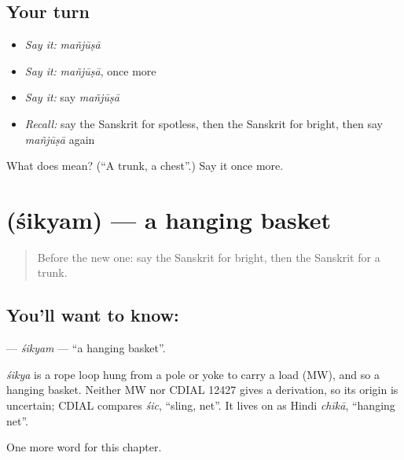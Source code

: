 \subsection*{Your turn}
\begin{itemize}
\raggedright
  \item \emph{Say it:} \emph{mañjūṣā}
  \item \emph{Say it:} \emph{mañjūṣā}, once more
  \item \emph{Say it:} say \emph{mañjūṣā}
  \item \emph{Recall:} say the Sanskrit for spotless, then the Sanskrit for bright, then say \emph{mañjūṣā} again
\end{itemize}

\begin{tcolorbox}[breakable,colback=teal!4,colframe=teal!35!black,title={Before you move on}]
What does  mean? (\textquotedblleft{}A trunk, a chest\textquotedblright{}.) Say it once more.
\end{tcolorbox}
\section[\texorpdfstring{\sk{शिक्यम्} (śikyam)}{शिक्यम् (śikyam)}]{ (śikyam) — a hanging basket}

\label{lesson:SA-C189-sikyam}



\begin{quote}
Before the new one: say the Sanskrit for bright, then the Sanskrit for a trunk.
\end{quote}

\subsection*{You'll want to know: }
\textbf{} — \emph{śikyam} — \textquotedblleft{}a hanging basket\textquotedblright{}.

\begin{cousinweb}
\emph{śikya} is a rope loop hung from a pole or yoke to carry a load (MW), and so a hanging basket. Neither MW nor CDIAL 12427 gives a derivation, so its origin is uncertain; CDIAL compares \emph{śic}, \textquotedblleft{}sling, net\textquotedblright{}. It lives on as Hindi \emph{chīkā}, \textquotedblleft{}hanging net\textquotedblright{}.
\end{cousinweb}

\begin{grammarlens}[title={What you've built}]
One more word for this chapter.
\end{grammarlens}

